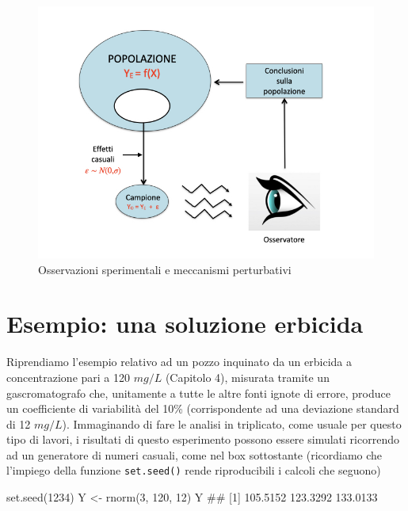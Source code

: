 \documentclass[a4paper,12pt,oneside]{book}
\newenvironment{Shaded}{\begin{snugshade}}{\end{snugshade}}
\newcommand{\DecValTok}[1]{#1}
\newcommand{\DocumentationTok}[1]{#1}
\newcommand{\OtherTok}[1]{#1}
\newcommand{\FunctionTok}[1]{#1}
\newcommand{\NormalTok}[1]{#1}
\begin{document}
\begin{figure}

{\centering \includegraphics[width=0.75\linewidth]{_images/InferenceProcess} 

}

\caption{Osservazioni sperimentali e meccanismi perturbativi}\label{fig:figName61}
\end{figure}

\hypertarget{esempio-una-soluzione-erbicida}{%
\section{Esempio: una soluzione erbicida}\label{esempio-una-soluzione-erbicida}}

Riprendiamo l'esempio relativo ad un pozzo inquinato da un erbicida a concentrazione pari a 120 \(mg/L\) (Capitolo 4), misurata tramite un gascromatografo che, unitamente a tutte le altre fonti ignote di errore, produce un coefficiente di variabilità del 10\% (corrispondente ad una deviazione standard di 12 \(mg/L\)). Immaginando di fare le analisi in triplicato, come usuale per questo tipo di lavori, i risultati di questo esperimento possono essere simulati ricorrendo ad un generatore di numeri casuali, come nel box sottostante (ricordiamo che l'impiego della funzione \texttt{set.seed()} rende riproducibili i calcoli che seguono)

\begin{Shaded}
\begin{Highlighting}[]
\FunctionTok{set.seed}\NormalTok{(}\DecValTok{1234}\NormalTok{)}
\NormalTok{Y }\OtherTok{\textless{}{-}} \FunctionTok{rnorm}\NormalTok{(}\DecValTok{3}\NormalTok{, }\DecValTok{120}\NormalTok{, }\DecValTok{12}\NormalTok{)}
\NormalTok{Y}
\DocumentationTok{\#\# [1] 105.5152 123.3292 133.0133}
\end{Highlighting}
\end{Shaded}
\end{document}
